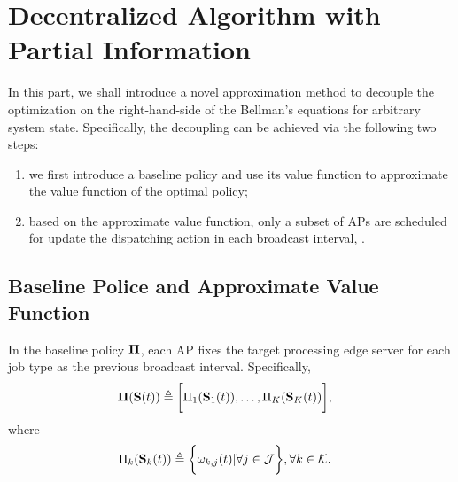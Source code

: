 \section{Decentralized Algorithm with Partial Information}
\label{sec:algorithm}

In this part, we shall introduce a novel approximation method to decouple the optimization on the right-hand-side of the Bellman's equations for arbitrary system state.
Specifically, the decoupling can be achieved via the following two steps:
\begin{enumerate}
    \item we first introduce a baseline policy and use its value function to approximate the value function of the optimal policy;
    \item based on the approximate value function, only a {subset of APs} are scheduled for update the dispatching action in each broadcast interval, .
\end{enumerate}

\subsection{Baseline Police and Approximate Value Function}
\label{subsec:baseline}
\begin{definition}
    In the baseline policy $\boldsymbol{\Pi}$, each AP fixes the target processing edge server for each job type as the previous broadcast interval. Specifically,
    \begin{align}
        \boldsymbol{\Pi}(\mathbf{S}(t)) &\triangleq \bigg[ \Pi_{1}(\mathbf{S}_{1}(t)), \dots, \Pi_{K}(\mathbf{S}_{K}(t)) \bigg],
    \end{align}
    where 
    \begin{align}
        \Pi_{k}(\mathbf{S}_{k}(t)) &\triangleq \bigg\{
            \omega_{k,j}(t) | \forall j\in\mathcal{J}
        \bigg\}, \forall k\in\mathcal{K}.
    \end{align}
\end{definition}

